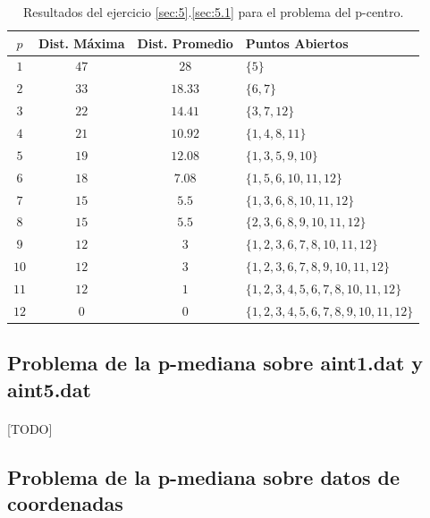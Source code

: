\documentclass[spanish]{article}
\begin{document}
			\begin{table}[h]
				\begin{center}
					\begin{tabular}{|c || c || c || l | }
						\hline
						$p$		& Dist. Máxima 	& Dist. Promedio	& Puntos Abiertos	 \\ \hline \hline
						$1$ 	& $47$ 					& $28$						& $\{5\}$ \\ \hline
						$2$ 	& $33$ 					& $18.33$					& $\{6,7\}$ \\ \hline
						$3$ 	& $22$ 					& $14.41$					& $\{3,7,12\}$ \\ \hline
						$4$ 	& $21$ 					& $10.92$					& $\{1,4,8,11\}$ \\ \hline
						$5$ 	& $19$ 					& $12.08$					& $\{1,3,5,9,10\}$ \\ \hline
						$6$ 	& $18$ 					& $7.08$					& $\{1,5,6,10,11,12 \}$ \\ \hline
						$7$ 	& $15$ 					& $5.5$						& $\{1,3,6,8,10,11,12\}$ \\ \hline
						$8$ 	& $15$ 					& $5.5$						& $\{2,3,6,8,9,10,11,12\}$ \\ \hline
						$9$ 	& $12$ 					& $3$							& $\{1,2,3,6,7,8,10,11,12\}$ \\ \hline
						$10$ 	& $12$ 					& $3$							& $\{1,2,3,6,7,8,9,10,11,12\}$ \\ \hline
						$11$ 	& $12$ 					& $1$							& $\{1,2,3,4,5,6,7,8,10,11,12\}$ \\ \hline
						$12$ 	& $0$ 					& $0$							& $\{1,2,3,4,5,6,7,8,9,10,11,12\}$ \\
						\hline
					\end{tabular}
				\end{center}
				\caption{Resultados del ejercicio \ref{sec:5}.\ref{sec:5.1} para el problema del p-centro.}
				\label{table:sol-5.1center}
			\end{table}

		\subsection{Problema de la p-mediana sobre aint1.dat y aint5.dat}
		\label{sec:5.2}

			\paragraph{}
			[TODO]

		\subsection{Problema de la p-mediana sobre datos de coordenadas}
		\label{sec:5.3}
\end{document}
